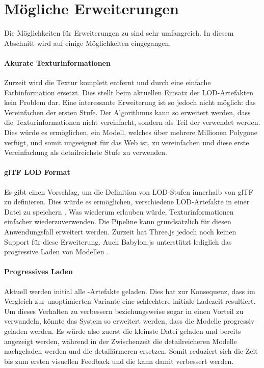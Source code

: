 
\section{Mögliche Erweiterungen}
Die Möglichkeiten für Erweiterungen zu  sind sehr umfangreich. In diesem Abschnitt wird auf einige Möglichkeiten eingegangen.

\paragraph{Akurate Texturinformationen}
Zurzeit wird die Textur komplett entfernt und durch eine einfache Farbinformation ersetzt. Dies stellt beim aktuellen Einsatz der LOD-Artefakten kein Problem dar. Eine interessante Erweiterung ist so jedoch nicht möglich: das Vereinfachen der ersten Stufe. Der Algorithmus kann so erweitert werden, dass die Texturinformationen nicht vereinfacht, sondern als Teil der  verwendet werden. Dies würde es ermöglichen, ein Modell, welches über mehrere Millionen Polygone verfügt, und somit ungeeignet für das Web ist, zu vereinfachen und diese erste Vereinfachung als detailreichste Stufe zu verwenden.

\paragraph{glTF LOD Format}
Es gibt einen Vorschlag, um die Definition von LOD-Stufen innerhalb von glTF zu definieren. Dies würde es ermöglichen, verschiedene LOD-Artefakte in einer Datei zu speichern \cite{glTFExtensionLOD}. Was wiederum erlauben würde, Texturinformationen einfacher wiederzuverwenden. Die Pipeline kann grundsätzlich für diesen Anwendungsfall erweitert werden.
Zurzeit hat Three.js jedoch noch keinen Support für diese Erweiterung. Auch Babylon.js unterstützt lediglich das progressive Laden von Modellen \cite{babylonProgressiveLoading}.

\paragraph{Progressives Laden}
Aktuell werden initial alle -Artefakte geladen. Dies hat zur Konsequenz, dass im Vergleich zur unoptimierten Variante eine schlechtere initiale Ladezeit resultiert. Um dieses Verhalten zu verbessern beziehungsweise sogar in einen Vorteil zu verwandeln, könnte das System so erweitert werden, dass die Modelle progressiv geladen werden. Es würde also zuerst die kleinste Datei geladen und bereits angezeigt werden, während in der Zwischenzeit die detailreicheren Modelle nachgeladen werden und die detailärmeren ersetzen. Somit reduziert sich die Zeit bis zum ersten visuellen Feedback und die  kann damit verbessert werden.

